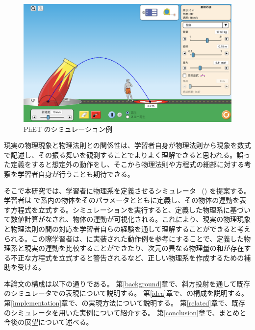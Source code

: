 \begin{figure}[htb]
\centering
\includegraphics*[width=0.9\linewidth]{figure/PhET_example.png}
\caption{PhET のシミュレーション例} \label{numeral_based}
\end{figure}

現実の物理現象と物理法則との関係性は、学習者自身が物理法則から現象を数式で記述し、その振る舞いを観測することでよりよく理解できると思われる。誤った定義をすると想定外の動作をし、そこから物理法則や方程式の細部に対する考察を学習者自身が行うことも期待できる。

そこで本研究では、学習者に物理系を定義させるシミュレータ \simnamealt~(\simname) を提案する。学習者は \simname で系内の物体をそのパラメータとともに定義し、その物体の運動を表す方程式を立式する。シミュレーションを実行すると、定義した物理系に基づいて数値計算がなされ、物体の運動が可視化される。これにより、現実の物理現象と物理法則の間の対応を学習者自らの経験を通して理解することができると考えられる。この際学習者は、\simname に実装された動作例を参考にすることで、定義した物理系と現実の運動を比較することができたり、次元の異なる物理量の和が存在する不正な方程式を立式すると警告されるなど、正しい物理系を作成するための補助を受ける。

本論文の構成は以下の通りである。
第\ref{background}章で、斜方投射を通して既存のシミュレータでの表現について説明する。
第\ref{idea}章で、\simname の構成を説明する。
第\ref{implementation}章で、\simname の実現方法について説明する。
第\ref{related}章で、既存のシミュレータを用いた実例について紹介する。
第\ref{conclusion}章で、まとめと今後の展望について述べる。
